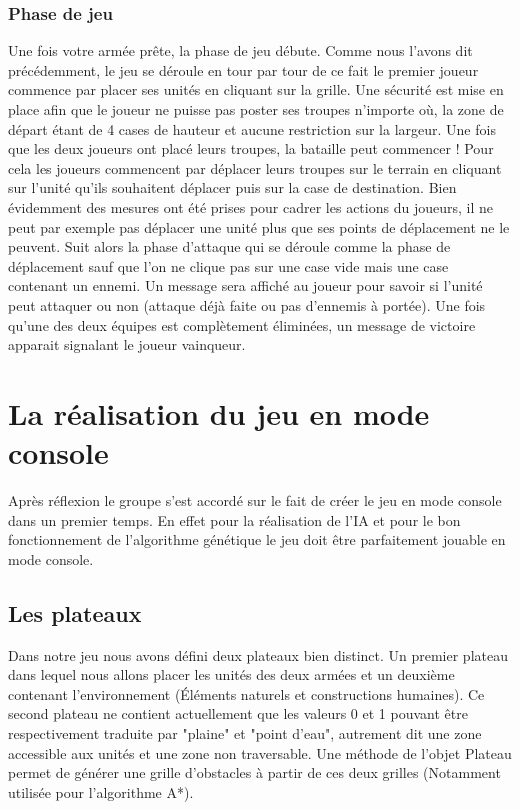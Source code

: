 \documentclass{article}
\begin{document}
  \subsubsection{Phase de jeu}
  Une fois votre armée prête, la phase de jeu débute. Comme nous l'avons dit précédemment, le jeu se déroule en tour par tour de ce fait le premier joueur commence par placer ses unités en cliquant sur la grille. Une sécurité est mise en place afin que le joueur ne puisse pas poster ses troupes n'importe où, la zone de départ étant de 4 cases de hauteur et aucune restriction sur la largeur. Une fois que les deux joueurs ont placé leurs troupes, la bataille peut commencer ! Pour cela les joueurs commencent par déplacer leurs troupes sur le terrain en cliquant sur l'unité qu'ils souhaitent déplacer puis sur la case de destination. Bien évidemment des mesures ont été prises pour cadrer les actions du joueurs, il ne peut par exemple pas déplacer une unité plus que ses points de déplacement ne le peuvent. Suit alors la phase d'attaque qui se déroule comme la phase de déplacement sauf que l'on ne clique pas sur une case vide mais une case contenant un ennemi. Un message sera affiché au joueur pour savoir si l'unité peut attaquer ou non (attaque déjà faite ou pas d'ennemis à portée). Une fois qu'une des deux équipes est complètement éliminées, un message de victoire apparait signalant le joueur vainqueur.

\section{La réalisation du jeu en mode console}
Après réflexion le groupe s'est accordé sur le fait de créer le jeu en mode console dans un premier temps.
En effet pour la réalisation de l'IA et pour le bon fonctionnement de l'algorithme génétique le jeu doit être parfaitement jouable en mode console.

 \subsection{Les plateaux}
 Dans notre jeu nous avons défini deux plateaux bien distinct. Un premier plateau dans lequel nous allons placer les unités des deux armées et un deuxième contenant l'environnement (Éléments naturels et constructions humaines). Ce second plateau ne contient actuellement que les valeurs 0 et 1 pouvant être respectivement traduite par "plaine" et "point d'eau", autrement dit une zone accessible aux unités et une zone non traversable. Une méthode de l'objet Plateau permet de générer une grille d'obstacles à partir de ces deux grilles (Notamment utilisée pour l'algorithme A*).
 
\end{document}
